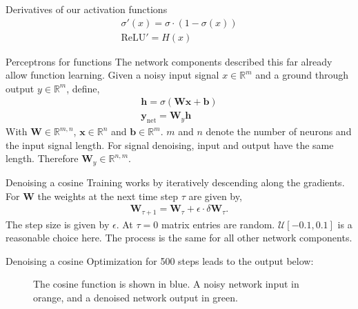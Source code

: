 \documentclass[notes]{beamer}
\begin{document}
    \begin{frame}{Derivatives of our activation functions}
      \begin{align}
        \sigma'(x) = \sigma \cdot (1 - \sigma(x)) \\
        \text{ReLU}' = H(x) 
      \end{align}
      \begin{figure}
        
        
      \end{figure}
    \end{frame}

    \begin{frame}{Perceptrons for functions}
      The network components described this far already allow function learning.
      Given a noisy input signal $x \in \mathbb{R}^{m}$ and a ground through output $y \in \mathbb{R}^m$,
      define,
      \begin{align}
        \mathbf{h} = \sigma(\mathbf{W}\mathbf{x} + \mathbf{b}) \\
        \mathbf{y}_{\text{net}} = \mathbf{W}_y\mathbf{h}
      \end{align}
      With $\mathbf{W} \in \mathbb{R}^{m,n}$, $\mathbf{x} \in \mathbb{R}^{n}$ and $\mathbf{b} \in \mathbb{R}^{m}$.
      $m$ and $n$ denote the number of neurons and the input signal length.
      For signal denoising, input and output have the same length. Therefore $\mathbf{W}_y \in \mathbb{R}^{n,m}$.
    \end{frame}

    \begin{frame}{Denoising a cosine}
      Training works by iteratively descending along the gradients. For $\mathbf{W}$ the weights at the
      next time step $\tau$ are given by,
      \begin{align}
        \mathbf{W}_{\tau + 1} = \mathbf{W}_\tau + \epsilon \cdot \delta\mathbf{W}_{\tau}.
      \end{align}
      The step size is given by $\epsilon$. At $\tau = 0$ matrix entries are random.
      $\mathcal{U}[-0.1, 0.1]$ is a reasonable choice here.
      The process is the same for all other network components.
    \end{frame}


    \begin{frame}{Denoising a cosine}
      Optimization for 500 steps leads to the output below:
      \begin{figure}
        
        \caption{The cosine function is shown in blue. A noisy network input in orange, and a denoised network output in green.}
        \end{figure}
    \end{frame}
\end{document}
